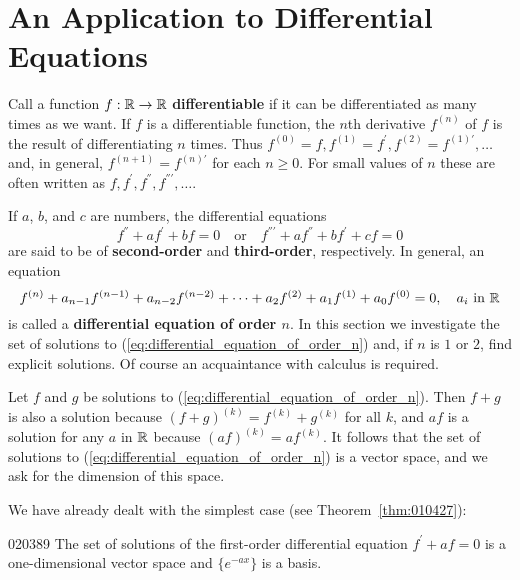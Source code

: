 \section{An Application to Differential Equations}
\label{sec:6_6}

Call a function $f : \mathbb{R} \to \mathbb{R}$ \textbf{differentiable} if it can be differentiated as many times as we want. If $f$ is a differentiable function, the $n$th derivative $f^{(n)}$ of $f$ is the result of differentiating $n$ times. Thus $f^{(0)} = f,  f^{(1)} = f^\prime, f^{(2)} = f^{(1)\prime}, \dots$ and, in general, $f^{(n+1)} = f^{(n)\prime}$ for each $n \geq 0$. For small values of $n$ these are often written as $f,  f^\prime, f^\dprime, f^{\dprime\prime}, \dots$.

If $a$, $b$, and $c$ are numbers, the differential equations
\begin{equation*}
f^\dprime + af^\prime + bf = 0 \quad \mbox{or} \quad f^{\dprime\prime} + af^\dprime + bf^\prime + cf = 0
\end{equation*}
are said to be of \textbf{second-order} and \textbf{third-order}, respectively. In general, an equation
\begin{equation}
\label{eq:differential_equation_of_order_n}
f^{(n)} + a_{n - 1}f^{(n - 1)} + a_{n - 2}f^{(n - 2)} + \dots + a_2f^{(2)} + a_1f^{(1)} + a_0f^{(0)} = 0, \quad a_i \mbox{ in } \mathbb{R}
\end{equation}
is called a \textbf{differential equation of order $n$}. In this section we investigate the set of solutions to (\ref{eq:differential_equation_of_order_n}) and, if $n$ is $1$ or $2$, find explicit solutions. Of course an acquaintance with calculus is required.

Let $f$ and $g$ be solutions to (\ref{eq:differential_equation_of_order_n}). Then $f + g$ is also a solution because $(f + g)^{(k)} = f^{(k)} + g^{(k)}$ for all $k$, and $af$ is a solution for any $a$ in $\mathbb{R}$ because $(af)^{(k)} = af^{(k)}$. It follows that the set of solutions to (\ref{eq:differential_equation_of_order_n}) is a vector space, and we ask for the dimension of this space.

We have already dealt with the simplest case (see Theorem~\ref{thm:010427}):

\begin{theorem}{}{020389}
The set of solutions of the first-order differential equation $f^\prime + af = 0$ is a one-dimensional vector space and $\{e^{-ax}\}$ is a basis.
\end{theorem}

